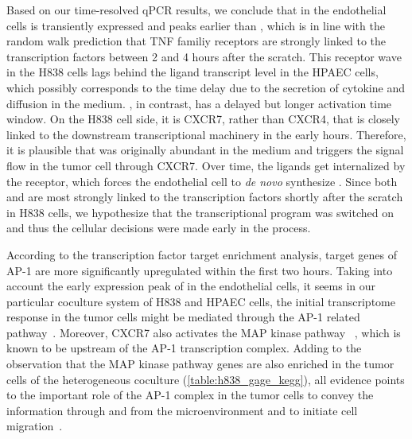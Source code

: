 \begin{itemize}
Based on our time-resolved qPCR results, we conclude that \tnfa in the endothelial 
cells is 
transiently expressed and peaks earlier than \sdfonea, which is in line with
the random walk prediction that TNF familiy receptors are strongly linked to
the transcription factors between 2 and 4 hours after the scratch. This receptor
wave in the H838 cells lags behind the ligand transcript level in the HPAEC cells,
which possibly corresponds to the time delay due to the 
secretion of cytokine and diffusion in the medium.
\sdfonea, in contrast, has
a delayed but longer activation time window. 
On the H838 cell side, it is CXCR7, rather than CXCR4, that
is closely linked to the downstream transcriptional machinery
in the early hours. Therefore, it is plausible that \sdfonea
was originally abundant in the medium and triggers the 
signal flow in the tumor cell through CXCR7. 
Over time, the ligands get
internalized by the receptor, 
which forces the endothelial cell to 
\emph{de novo} synthesize \sdfonea. Since both \tnfa and
\sdfonea are most strongly linked to the transcription
factors shortly after the scratch in H838 cells, we hypothesize
that the transcriptional program was switched on and thus the
cellular decisions were made early in the process.


According to the transcription factor target enrichment analysis, target genes
of AP-1 are more significantly upregulated within the first two hours. 
Taking into account
the early expression peak of \tnfa in the endothelial cells, it seems
in our particular coculture system of H838 and HPAEC cells, the initial 
transcriptome response in the tumor cells might be mediated through the AP-1
related pathway~\citep{Kulbe2005}. 
Moreover, CXCR7 also activates the MAP kinase pathway%
~\citep{Rajagopal2010a},
which is 
known to be upstream of the AP-1 transcription complex.
Adding to the observation that the MAP kinase pathway genes are also enriched 
in the tumor cells of the heterogeneous coculture 
(\ref{table:h838_gage_kegg}), 
all evidence points to the important role of the
AP-1 complex in the tumor cells to convey the information 
through \tnfa and \sdfonea from the microenvironment and to initiate cell
migration~\citep{Busch2008,Singh2012}.


\end{itemize}
